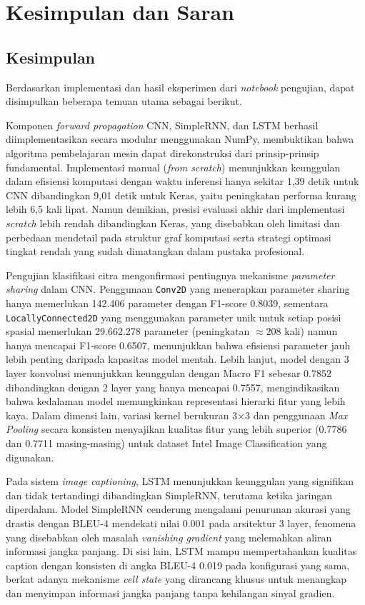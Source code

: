 
\chapter{Kesimpulan dan Saran}

\section{Kesimpulan}

Berdasarkan implementasi dan hasil eksperimen dari \textit{notebook} pengujian, dapat disimpulkan beberapa temuan utama sebagai berikut.

Komponen \textit{forward propagation} CNN, SimpleRNN, dan LSTM berhasil diimplementasikan secara modular menggunakan NumPy, membuktikan bahwa algoritma pembelajaran mesin dapat direkonstruksi dari prinsip-prinsip fundamental. Implementasi manual (\textit{from scratch}) menunjukkan keunggulan dalam efisiensi komputasi dengan waktu inferensi hanya sekitar 1,39 detik untuk CNN dibandingkan 9,01 detik untuk Keras, yaitu peningkatan performa kurang lebih 6,5 kali lipat. Namun demikian, presisi evaluasi akhir dari implementasi \textit{scratch} lebih rendah dibandingkan Keras, yang disebabkan oleh limitasi dan perbedaan mendetail pada struktur graf komputasi serta strategi optimasi tingkat rendah yang sudah dimatangkan dalam pustaka profesional.

Pengujian klasifikasi citra mengonfirmasi pentingnya mekanisme \textit{parameter sharing} dalam CNN. Penggunaan \texttt{Conv2D} yang menerapkan parameter sharing hanya memerlukan 142.406 parameter dengan F1-score 0.8039, sementara \texttt{LocallyConnected2D} yang menggunakan parameter unik untuk setiap posisi spasial memerlukan 29.662.278 parameter (peningkatan $\approx 208$ kali) namun hanya mencapai F1-score 0.6507, menunjukkan bahwa efisiensi parameter jauh lebih penting daripada kapasitas model mentah. Lebih lanjut, model dengan 3 layer konvolusi menunjukkan keunggulan dengan Macro F1 sebesar 0.7852 dibandingkan dengan 2 layer yang hanya mencapai 0.7557, mengindikasikan bahwa kedalaman model memungkinkan representasi hierarki fitur yang lebih kaya. Dalam dimensi lain, variasi kernel berukuran 3$\times$3 dan penggunaan \textit{Max Pooling} secara konsisten menyajikan kualitas fitur yang lebih superior (0.7786 dan 0.7711 masing-masing) untuk dataset Intel Image Classification yang digunakan.

Pada sistem \textit{image captioning}, LSTM menunjukkan keunggulan yang signifikan dan tidak tertandingi dibandingkan SimpleRNN, terutama ketika jaringan diperdalam. Model SimpleRNN cenderung mengalami penurunan akurasi yang drastis dengan BLEU-4 mendekati nilai 0.001 pada arsitektur 3 layer, fenomena yang disebabkan oleh masalah \textit{vanishing gradient} yang melemahkan aliran informasi jangka panjang. Di sisi lain, LSTM mampu mempertahankan kualitas caption dengan konsisten di angka BLEU-4 0.019 pada konfigurasi yang sama, berkat adanya mekanisme \textit{cell state} yang dirancang khusus untuk menangkap dan menyimpan informasi jangka panjang tanpa kehilangan sinyal gradien.

